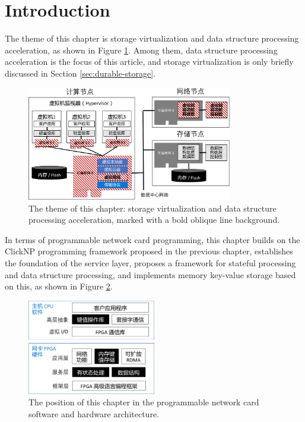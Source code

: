 \section{Introduction}
\label{kvdirect:sec:introduction}

The theme of this chapter is storage virtualization and data structure processing acceleration, as shown in Figure \ref{kvdirect:fig:sys-arch}. Among them, data structure processing acceleration is the focus of this article, and storage virtualization is only briefly discussed in Section \ref{sec:durable-storage}.

\begin{figure}[htbp]
	\centering
	\includegraphics[width=0.8\textwidth]{figure/sys_arch.pdf}
	\caption{The theme of this chapter: storage virtualization and data structure processing acceleration, marked with a bold oblique line background.}
	\label{kvdirect:fig:sys-arch}
\end{figure}

In terms of programmable network card programming, this chapter builds on the ClickNP programming framework proposed in the previous chapter, establishes the foundation of the service layer, proposes a framework for stateful processing and data structure processing, and implements memory key-value storage based on this, as shown in Figure \ref{kvdirect:fig:sw-hw-codesign}.

\begin{figure}[htbp]
	\centering
	\includegraphics[width=0.5\textwidth]{figure/sw_hw_codesign.pdf}
	\caption{The position of this chapter in the programmable network card software and hardware architecture.}
	\label{kvdirect:fig:sw-hw-codesign}
\end{figure}


